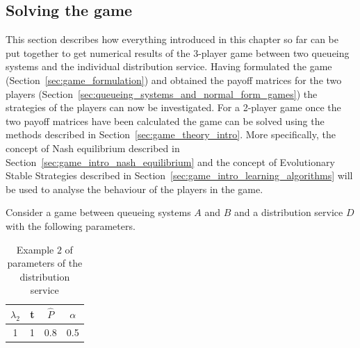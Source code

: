 \subsection{Solving the game}\label{sec:game_solving}

This section describes how everything introduced in this chapter so far can be
put together to get numerical results of the 3-player game between two queueing
systems and the individual distribution service.
Having formulated the game (Section~\ref{sec:game_formulation}) and obtained
the payoff matrices for the two players
(Section~\ref{sec:queueing_systems_and_normal_form_games}) the strategies of
the players can now be investigated.
For a 2-player game once the two payoff matrices have been calculated
the game can be solved using the methods described in
Section~\ref{sec:game_theory_intro}.
More specifically, the concept of Nash equilibrium described in
Section~\ref{sec:game_intro_nash_equilibrium} and the concept of Evolutionary
Stable Strategies described in Section~\ref{sec:game_intro_learning_algorithms}
will be used to analyse the behaviour of the players in the game.

Consider a game between queueing systems \(A\) and \(B\) and a distribution
service \(D\) with the following parameters.

\begin{table}[H]
    \caption{Example \(2\) of parameters of the distribution service}
    \begin{center}
        \begin{tabular}{||c|c|c|c||}
            \hline
            \(\lambda_2\) & t & \(\hat{P}\) & \(\alpha\) \\
            \hline\hline
            1 & 1 & 0.8 & 0.5 \\
            \hline
        \end{tabular}
    \end{center}
    \label{tab:solving_game_dist_service_parameters}
\end{table}

